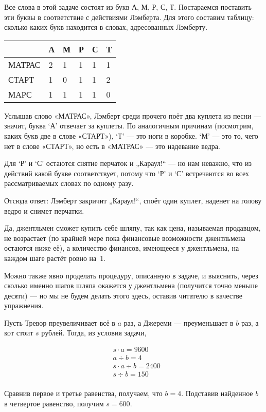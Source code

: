 
\begin{itemize}
\itA Все слова в этой задаче состоят из букв А, М, Р, С, Т. Постараемся поставить эти буквы в соответствие с действиями Лэмберта. Для этого составим таблицу: сколько каких букв находится в словах, адресованных Лэмберту.

\begin{center} \begin{tabular}{|l|l|l|l|l|l|}
\hline		& А & М & Р & С & Т \\ \hline
\ttfamily МАТРАС & 2 & 1 & 1 & 1 & 1 \\ \hline
\ttfamily СТАРТ & 1 & 0 & 1 & 1 & 2 \\ \hline
\ttfamily МАРС & 1 & 1 & 1 & 1 & 0 \\ \hline
\end{tabular} \end{center}

Услышав слово {\ttfamily «МАТРАС»}, Лэмберт среди прочего поёт два куплета из песни — значит, буква `А' отвечает за куплеты. По аналогичным причинам (посмотрим, каких букв две в слове {\ttfamily «СТАРТ»}), `Т' — это ноги в коробке. `М' — это то, чего нет в слове {\ttfamily «СТАРТ»}, но есть в {\ttfamily «МАТРАС»} — это надевание ведра.

Для `Р' и `С' остаются снятие перчаток и „Караул!“ — но нам неважно, что из действий какой букве соответствует, потому что `Р' и `С' встречаются во всех рассматриваемых словах по одному разу.

Отсюда ответ: Лэмберт закричит „Караул!“, споёт один куплет, наденет на голову ведро и снимет перчатки.

\itB Да, джентльмен сможет купить себе шляпу, так как цена, называемая продавцом, не возрастает (по крайней мере пока финансовые возможности джентльмена остаются ниже её), а количество финансов, имеющееся у джентльмена, на каждом шаге растёт ровно на~1.

Можно также явно проделать процедуру, описанную в задаче, и выяснить, через сколько именно шагов шляпа окажется у джентльмена (получится точно меньше десяти) — но мы не будем делать этого здесь, оставив читателю в качестве упражнения.

\itC Пусть Тревор преувеличивает всё в $a$ раз, а Джереми — преуменьшает в $b$ раз, а кот стоит $s$ рублей. Тогда, из условия задачи,

\begin{align*}
	& s \cdot a = 9600 \\
	& a \div b = 4 \\
	& s \cdot a \div b = 2400 \\
	& s \div b = 150 \\
\end{align*}

\vspace{-0.4cm}
Сравнив первое и третье равенства, получаем, что $b=4$. Подставив найденное $b$ в четвертое равенство, получим $s=600$.

\end{itemize}